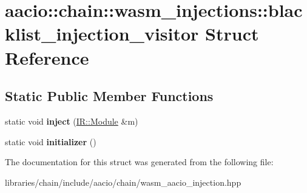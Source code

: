 \hypertarget{structaacio_1_1chain_1_1wasm__injections_1_1blacklist__injection__visitor}{}\section{aacio\+:\+:chain\+:\+:wasm\+\_\+injections\+:\+:blacklist\+\_\+injection\+\_\+visitor Struct Reference}
\label{structaacio_1_1chain_1_1wasm__injections_1_1blacklist__injection__visitor}
\subsection*{Static Public Member Functions}
\begin{DoxyCompactItemize}
\item 
\mbox{\label{structaacio_1_1chain_1_1wasm__injections_1_1blacklist__injection__visitor_ad6cd1cccab039b4c4892798dc4667f45}} 
static void {\bfseries inject} (\mbox{\hyperlink{struct_i_r_1_1_module}{I\+R\+::\+Module}} \&m)
\item 
\mbox{\label{structaacio_1_1chain_1_1wasm__injections_1_1blacklist__injection__visitor_a0c3f7dab0aeb2c53cdea590d27d930b6}} 
static void {\bfseries initializer} ()
\end{DoxyCompactItemize}


The documentation for this struct was generated from the following file\+:\begin{DoxyCompactItemize}
\item 
libraries/chain/include/aacio/chain/wasm\+\_\+aacio\+\_\+injection.\+hpp\end{DoxyCompactItemize}
